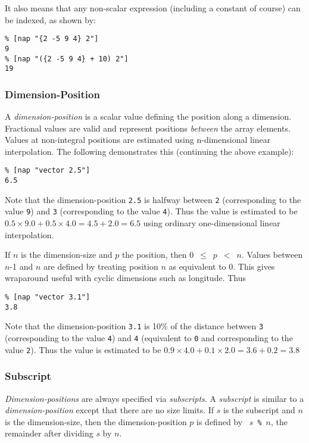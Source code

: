 It also means that any non-scalar expression (including a
constant of course) can be indexed, as shown by:
  \begin{verbatim}
% [nap "{2 -5 9 4} 2"]
9
% [nap "({2 -5 9 4} + 10) 2"]
19
\end{verbatim}

\subsubsection{Dimension-Position}
    \label{indexing-Dimension-Position}

A 
  \emph{dimension-position} is a scalar value defining the position
  along a dimension. Fractional values are valid and represent
  positions 
  \emph{between} the array elements. Values at non-integral positions
  are estimated using n-dimensional linear interpolation. The following
  demonstrates this (continuing the above example):
  \begin{verbatim}
% [nap "vector 2.5"]
6.5
\end{verbatim}

Note that the dimension-position 
  \texttt{2.5} is halfway between 
  \texttt{2} (corresponding to the value 
  \texttt{9}) and 
  \texttt{3} (corresponding to the value 
  \texttt{4}). Thus the value is estimated to be 
    $0.5 \times 9.0 + 0.5 \times 4.0 = 4.5 + 2.0 = 6.5$
  using ordinary one-dimensional linear interpolation.

If 
  $n$ is the dimension-size and 
  $p$ the position, then 
  \mbox{0 $\le$ 
  $p$ $<$ 
  $n$.} Values between 
  $n$-1 and 
  $n$ are defined by treating position 
  $n$ as equivalent to 0. This gives wraparound useful with
  cyclic dimensions such as longitude. Thus
  \begin{verbatim}
% [nap "vector 3.1"]
3.8
\end{verbatim}

Note that the dimension-position 
  \texttt{3.1} is 10\% of the distance between 
  \texttt{3} (corresponding to the value 
  \texttt{4}) and 
  \texttt{4} (equivalent to 
  \texttt{0} and corresponding to the value 
  \texttt{2}). Thus the value is estimated to be 
    $0.9 \times 4.0 + 0.1 \times 2.0 = 3.6 + 0.2 = 3.8$

\subsubsection{Subscript}
    \label{indexing-Subscript}

  \emph{Dimension-positions} are always specified via 
  \emph{subscripts}. A 
  \emph{subscript} is similar to a 
  \emph{dimension-position} except that there are no size limits. If 
  $s$ is the subscript and 
  $n$ is the dimension-size, then the dimension-position 
  $p$ is defined by 
  \mbox{
  $s$ 
  \texttt{\%} 
  $n$,} the remainder after dividing 
  $s$ by 
  $n$.
  

